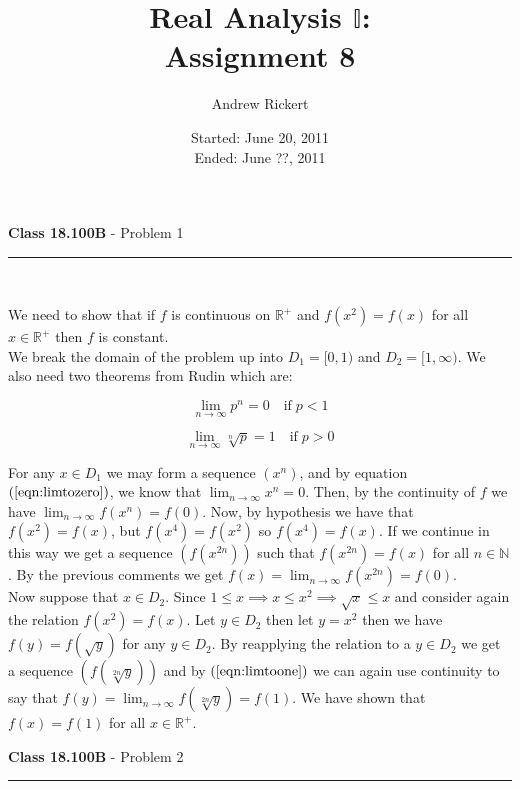 \documentclass[11pt,reqno]{article}
\title{Real Analysis $\mathbb{I}$: \\ Assignment 8}
\author{Andrew Rickert}
\date{Started: June 20, 2011 \\ \hspace{1pt} Ended: June ??,  2011}                                           %
\begin{document}
\maketitle


\begin{flushleft} 
\textbf{Class 18.100B} - Problem 1\\
\rule{500pt}{1pt}\\
\end{flushleft} 

We need to show that if $f$ is continuous on $\mathbb{R}^+$ and $f(x^2) = f(x)$ for all $x \in \mathbb{R}^+$ then $f$ is constant.\\
\indent We break the domain of the problem up into $D_1 = [0,1)$ and $D_2 = [1,\infty)$. We also need two theorems from Rudin which are:


\begin{equation}
\lim_{n \to \infty} p^n = 0 \quad \text{if} \; p < 1 \label{eqn:limtozero}
\end{equation}

\begin{equation}
\lim_{n \to \infty} \sqrt[n]{p} = 1 \quad \text{if} \; p > 0 \label{eqn:limtoone}
\end{equation}


For any $x \in D_1$ we may form a sequence $(x^n)$, and by equation $(\ref{eqn:limtozero})$, we know that $\lim_{n \to \infty} x^n = 0$. Then, by the continuity of $f$ we have $\lim_{n \to \infty} f(x^n) = f(0)$. Now, by hypothesis we have that \\
$f(x^2) = f(x)$, but $f(x^4) = f(x^2)$ so $f(x^4) = f(x)$. If we continue in this way we get a sequence $(f(x^{2n}))$ such that $f(x^{2n}) = f(x)$ for all $n \in \mathbb{N}$. By the previous comments we get $f(x) = \lim_{n \to \infty} f(x^{2n}) = f(0)$.\\
\indent Now suppose that $x \in D_2$. Since $1 \le x \implies x \le x^2 \implies \sqrt{x} \le x$ and consider again the relation $f(x^2) = f(x)$. Let $y \in D_2$ then let $y = x^2$ then we have $f(y) = f(\sqrt{y})$ for any $y \in D_2$. By reapplying the relation to a $y \in D_2$ we get a sequence $(f(\sqrt[2n]{y}))$ and by $(\ref{eqn:limtoone})$ we can again use continuity to say that $f(y) = \lim_{n \to \infty}f(\sqrt[2n]{y}) = f(1)$. We have shown that $f(x) = f(1)$ for all $x \in \mathbb{R}^+$.

\vspace{15pt}
\begin{flushleft} 
\textbf{Class 18.100B} - Problem 2\\
\rule{500pt}{1pt}\\
\end{flushleft} 
\end{document}
